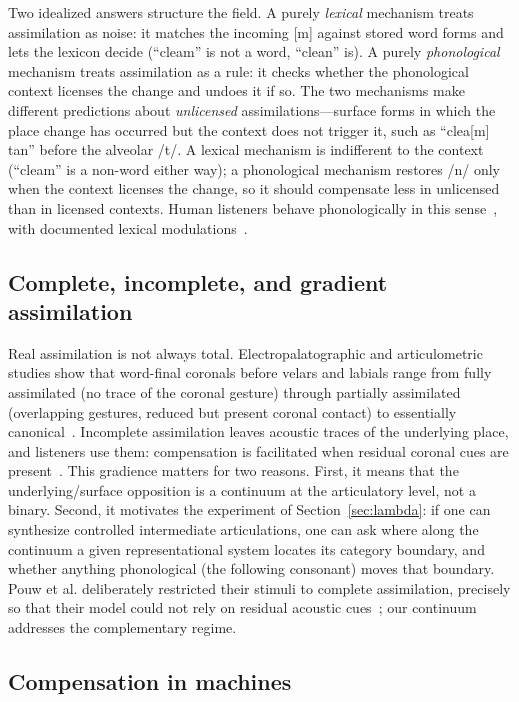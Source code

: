 \documentclass[11pt,a4paper]{article}
\begin{document}
Two idealized answers structure the field. A purely \emph{lexical}
mechanism treats assimilation as noise: it matches the incoming [m]
against stored word forms and lets the lexicon decide (``cleam'' is not
a word, ``clean'' is). A purely \emph{phonological} mechanism treats
assimilation as a rule: it checks whether the phonological context
licenses the change and undoes it if so. The two mechanisms make
different predictions about \emph{unlicensed} assimilations---surface
forms in which the place change has occurred but the context does not
trigger it, such as ``clea[m] tan'' before the alveolar /t/. A lexical
mechanism is indifferent to the context (``cleam'' is a non-word either
way); a phonological mechanism restores /n/ only when the context
licenses the change, so it should compensate less in unlicensed than in
licensed contexts. Human listeners behave phonologically in this
sense~\citep{gaskell1996,darcy2009}, with documented lexical
modulations~\citep{gmw2001}.

\subsection{Complete, incomplete, and gradient assimilation}

Real assimilation is not always total. Electropalatographic and
articulometric studies show that word-final coronals before velars and
labials range from fully assimilated (no trace of the coronal gesture)
through partially assimilated (overlapping gestures, reduced but
present coronal contact) to essentially canonical~\citep{nolan1992,
ellis2002,dilley2007}. Incomplete assimilation leaves acoustic traces
of the underlying place, and listeners use them: compensation is
facilitated when residual coronal cues are present~\citep{gaow2002}.
This gradience matters for two reasons. First, it means that the
underlying/surface opposition is a continuum at the articulatory level,
not a binary. Second, it motivates the experiment of
Section~\ref{sec:lambda}: if one can synthesize controlled
intermediate articulations, one can ask where along the continuum a
given representational system locates its category boundary, and
whether anything phonological (the following consonant) moves that
boundary. Pouw et al. deliberately restricted their stimuli to complete
assimilation, precisely so that their model could not rely on residual
acoustic cues~\citep{pouw2024}; our continuum addresses the complementary
regime.

\subsection{Compensation in machines}
\end{document}
